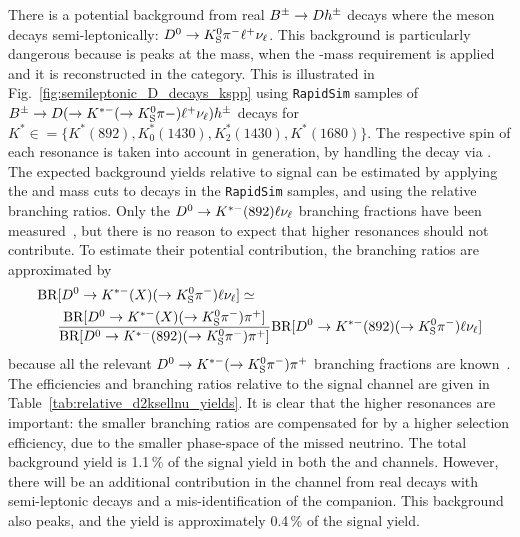 There is a potential background from real ${{B}^\pm}\rightarrow{\ensuremath{D}} h^\pm$ decays where the \D meson decays semi-leptonically: ${{D}^0}\rightarrow{\ensuremath{{K}^0_{\mathrm{S}}}}{\ensuremath{{\pi}^-}}\ell^+\nu_\ell$. This background is particularly dangerous because is peaks at the \B mass, when the \D-mass requirement is applied and it is reconstructed in the \DtoKspipi category. This is illustrated in Fig.~\ref{fig:semileptonic_D_decays_kspp} using \texttt{RapidSim} samples of ${{B}^\pm}\rightarrow{\ensuremath{D}}(\rightarrow K^{*-}(\rightarrow {\ensuremath{{K}^0_{\mathrm{S}}}}\pi-)\ell^+\nu_\ell)h^\pm $ decays for $K^{*}\in=\{K^*(892), K^*_0(1430), K^*_2(1430), K^*(1680)\}$. The respective spin of each resonance is taken into account in generation, by handling the decay via \evtgen. The expected background yields relative to signal can be estimated by applying the \B and \D mass cuts to decays in the \texttt{RapidSim} samples, and using the relative branching ratios. Only the ${{D}^0}\rightarrow{\ensuremath{{K}^{*-}}}(892)\ell\nu_\ell$ branching fractions have been measured~\cite{PDG2020}, but there is no reason to expect that higher \Kstar resonances should not contribute. To estimate their potential contribution, the branching ratios are approximated by
\begin{align*}
    \text{BR}&[{{D}^0}\rightarrow{\ensuremath{{K}^{*-}}}(X)(\rightarrow{\ensuremath{{K}^0_{\mathrm{S}}}}{\ensuremath{{\pi}^-}})\ell\nu_\ell] \simeq\\& \frac{\text{BR}[{{D}^0}\rightarrow{\ensuremath{{K}^{*-}}}(X)(\rightarrow{\ensuremath{{K}^0_{\mathrm{S}}}}{\ensuremath{{\pi}^-}}){{\pi}^+}] }{\text{BR}[{{D}^0}\rightarrow{\ensuremath{{K}^{*-}}}(892)(\rightarrow{\ensuremath{{K}^0_{\mathrm{S}}}}{\ensuremath{{\pi}^-}}){{\pi}^+}] }\text{BR}[{{D}^0}\rightarrow{\ensuremath{{K}^{*-}}}(892)(\rightarrow{\ensuremath{{K}^0_{\mathrm{S}}}}{\ensuremath{{\pi}^-}})\ell\nu_\ell] 
\end{align*}
because all the relevant ${{D}^0}\rightarrow{\ensuremath{{K}^{*-}}}(\rightarrow{\ensuremath{{K}^0_{\mathrm{S}}}}{\ensuremath{{\pi}^-}}){{\pi}^+}$ branching fractions are known~\cite{PDG2020
}. The efficiencies and branching ratios relative to the signal channel are given in Table~\ref{tab:relative_d2ksellnu_yields}. It is clear that the higher \Kstar resonances are important: the smaller branching ratios are compensated for by a higher selection efficiency, due to the smaller phase-space of the missed neutrino. The total background yield is 1.1\,\% of the signal yield in both the \BtoDpi and \BtoDK channels. However, there will be an additional contribution in the \BtoDK channel from real \BtoDpi decays with semi-leptonic \D decays and a mis-identification of the companion. This background also peaks, and the yield is approximately 0.4\,\% of the \BtoDK signal yield.

